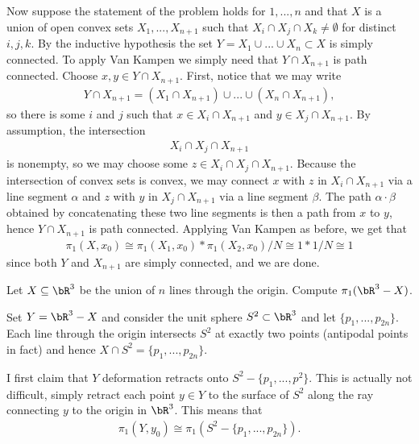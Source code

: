 \begin{homework}[e]
\begin{prf}
    Now suppose the statement of the problem holds for $1,...,n$ and that $X$ is a union of open convex sets $X_1,...,X_{n+1}$ such that $X_i \cap X_j \cap X_k \neq \emptyset$ for distinct $i,j,k$. By the inductive hypothesis the set $Y = X_1 \cup ... \cup X_n \subset X$ is simply connected. To apply Van Kampen we simply need that $Y \cap X_{n+1}$ is path connected. Choose $x,y \in Y \cap X_{n+1}$. First, notice that we may write
    \begin{align*}
      Y \cap X_{n+1} = (X_1 \cap X_{n+1}) \cup ... \cup (X_n \cap X_{n+1}),
    \end{align*}
    so there is some $i$ and $j$ such that $x \in X_i \cap X_{n+1}$ and $y \in X_j \cap X_{n+1}$. By assumption, the intersection
    \begin{align*}
      X_i \cap X_j \cap X_{n+1}
    \end{align*}
    is nonempty, so we may choose some $z \in X_i \cap X_j \cap X_{n+1}$. Because the intersection of convex sets is convex, we may connect $x$ with $z$ in $X_{i}\cap X_{n+1}$ via a line segment $\alpha$ and $z$ with $y$ in $X_j \cap X_{n+1}$ via a line segment $\beta$. The path $\alpha \cdot \beta$ obtained by concatenating these two line segments is then a path from $x$ to $y$, hence $Y \cap X_{n+1}$ is path connected. Applying Van Kampen as before, we get that
    \begin{align*}
      \pi_1(X,x_0) \cong \pi_1(X_1,x_0) \ast \pi_1(X_2,x_0)/N \cong 1 \ast 1/N \cong 1
    \end{align*}
    since both $Y$ and $X_{n+1}$ are simply connected, and we are done.
  \end{prf}
   Let $X \subseteq \bR^3$ be the union of $n$ lines through the origin. Compute $\pi_1(\bR^3 - X)$.
  \begin{prf}
    Set $Y = \bR^3 - X$ and consider the unit sphere $S^2 \subset \bR^3$ and let $\{p_1,...,p_{2n}\}$. Each line through the origin intersects $S^2$ at exactly two points (antipodal points in fact) and hence $X \cap S^2 = \{p_1,...,p_{2n}\}$.

    I first claim that $Y$ deformation retracts onto $S^2 - \{p_1,...,p^2\}$. This is actually not difficult, simply retract each point $y \in Y$ to the surface of $S^2$ along the ray connecting $y$ to the origin in $\bR^3$. This means that
    \begin{align*}
      \pi_1(Y,y_0) \cong \pi_1(S^2 - \{p_1,...,p_{2n}\}).
    \end{align*}
    

\end{prf}
\end{homework}
